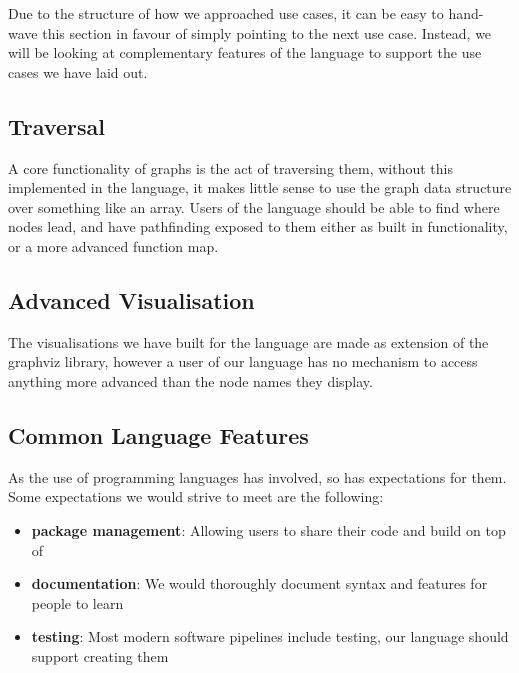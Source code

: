 Due to the structure of how we approached use cases, it can be easy to hand-wave this section in favour of simply
pointing to the next use case.
Instead, we will be looking at complementary features of the language to support the use cases we have laid out.

\subsection{Traversal}\label{subsec:traversal}
A core functionality of graphs is the act of traversing them, without this implemented in the language, it makes little
sense to use the graph data structure over something like an array.
Users of the language should be able to find where nodes lead, and have pathfinding exposed to them either as built in
functionality, or a more advanced function map.

\subsection{Advanced Visualisation}\label{subsec:advanced-visualisation}
The visualisations we have built for the language are made as extension of the graphviz library, however a user of our
language has no mechanism to access anything more advanced than the node names they display.

\subsection{Common Language Features}\label{subsec:common-language-features}
As the use of programming languages has involved, so has expectations for them.
Some expectations we would strive to meet are the following:
\begin{itemize}
    \item \textbf{package management}: Allowing users to share their code and build on top of
    \item \textbf{documentation}: We would thoroughly document syntax and features for people to learn
    \item \textbf{testing}: Most modern software pipelines include testing, our language should support creating them

\end{itemize}